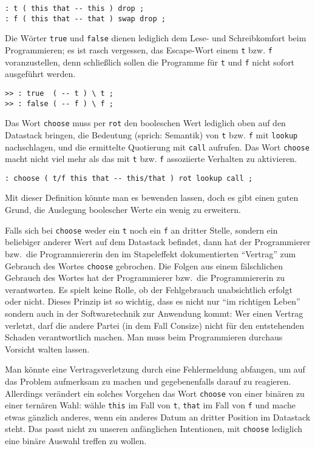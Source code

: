 \begin{verbatim}
: t ( this that -- this ) drop ;
: f ( this that -- that ) swap drop ;
\end{verbatim}

Die Wörter \verb|true| und \verb|false| dienen lediglich dem Lese- und Schreibkomfort beim Programmieren; es ist rasch vergessen, das Escape-Wort einem \verb|t| bzw. \verb|f| voranzustellen, denn schließlich sollen die Programme für \verb|t| und \verb|f| nicht sofort ausgeführt werden.

\begin{verbatim}
>> : true  ( -- t ) \ t ;
>> : false ( -- f ) \ f ;
\end{verbatim}

Das Wort \verb|choose| muss per \verb|rot| den booleschen Wert lediglich oben auf den Datastack bringen, die Bedeutung (sprich: Semantik) von \verb|t| bzw. \verb|f| mit \verb|lookup| nachschlagen, und die ermittelte Quotierung mit \verb|call| aufrufen. Das Wort \verb|choose| macht nicht viel mehr als das mit \verb|t| bzw. \verb|f| assoziierte Verhalten zu aktivieren.

\begin{verbatim}
: choose ( t/f this that -- this/that ) rot lookup call ;
\end{verbatim}

Mit dieser Definition könnte man es bewenden lassen, doch es gibt einen guten Grund, die Auslegung boolescher Werte ein wenig zu erweitern.

Falls sich bei \verb|choose| weder ein \verb|t| noch ein \verb|f| an dritter Stelle, sondern ein beliebiger anderer Wert auf dem Datastack befindet, dann hat der Programmierer bzw.\ die Programmiererin den im Stapeleffekt dokumentierten "`Vertrag"' zum Gebrauch des Wortes \verb|choose| gebrochen. Die Folgen aus einem fälschlichen Gebrauch des Wortes hat der Programmierer bzw.\ die Programmiererin zu verantworten. Es spielt keine Rolle, ob der Fehlgebrauch unabsichtlich erfolgt oder nicht. Dieses Prinzip ist so wichtig, dass es nicht nur "`im richtigen Leben"' sondern auch in der Softwaretechnik zur Anwendung kommt: Wer einen Vertrag verletzt, darf die andere Partei (in dem Fall Consize) nicht für den entstehenden Schaden verantwortlich machen. Man muss beim Programmieren durchaus Vorsicht walten lassen.

Man könnte eine Vertragsverletzung durch eine Fehlermeldung abfangen, um auf das Problem aufmerksam zu machen und gegebenenfalls darauf zu reagieren. Allerdings verändert ein solches Vorgehen das Wort \verb|choose| von einer binären zu einer ternären Wahl: wähle \verb|this| im Fall von \verb|t|, \verb|that| im Fall von \verb|f| und mache etwas gänzlich anderes, wenn ein anderes Datum an dritter Position im Datastack steht. Das passt nicht zu unseren anfänglichen Intentionen, mit \verb|choose| lediglich eine binäre Auswahl treffen zu wollen.

